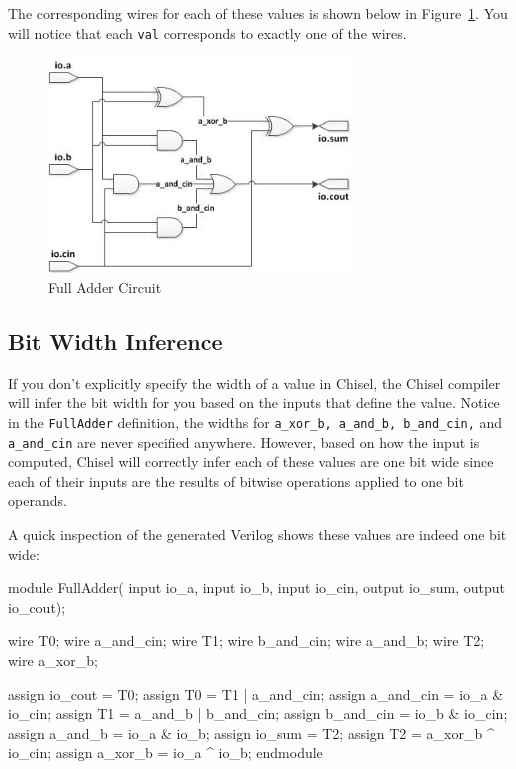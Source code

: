 The corresponding wires for each of these values is shown below in Figure~\ref{fig:full-adder}.  You will notice that each \verb+val+ corresponds to exactly one of the wires.

\begin{figure}[ht!]
\centering
\includegraphics[width=80mm]{figs/Full_Adder.jpg}
\caption{Full Adder Circuit}
\label{fig:full-adder}
\end{figure}


\subsection{Bit Width Inference}

If you don't explicitly specify the width of a value in Chisel, the Chisel compiler will infer the bit width for you based on the inputs that define the value. Notice in the \verb+FullAdder+ definition, the widths for \verb+a_xor_b, a_and_b, b_and_cin,+ and \verb+a_and_cin+ are never specified anywhere. However, based on how the input is computed, Chisel will correctly infer each of these values are one bit wide since each of their inputs are the results of bitwise operations applied to one bit operands.

A quick inspection of the generated Verilog shows these values are indeed one bit wide:

\begin{bash}
module FullAdder(
    input  io_a,
    input  io_b,
    input  io_cin,
    output io_sum,
    output io_cout);

  wire T0;
  wire a_and_cin;
  wire T1;
  wire b_and_cin;
  wire a_and_b;
  wire T2;
  wire a_xor_b;

  assign io_cout = T0;
  assign T0 = T1 | a_and_cin;
  assign a_and_cin = io_a & io_cin;
  assign T1 = a_and_b | b_and_cin;
  assign b_and_cin = io_b & io_cin;
  assign a_and_b = io_a & io_b;
  assign io_sum = T2;
  assign T2 = a_xor_b ^ io_cin;
  assign a_xor_b = io_a ^ io_b;
endmodule
\end{bash}

